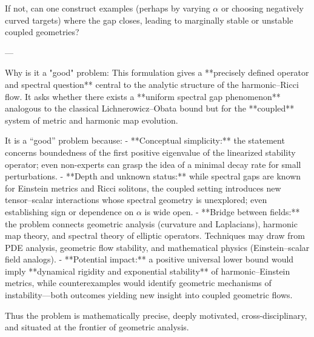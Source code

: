If not, can one construct examples (perhaps by varying \(\alpha\) or choosing negatively curved targets) where the gap closes, leading to marginally stable or unstable coupled geometries?

---

Why is it a "good" problem:  
This formulation gives a **precisely defined operator and spectral question** central to the analytic structure of the harmonic–Ricci flow. It asks whether there exists a **uniform spectral gap phenomenon** analogous to the classical Lichnerowicz–Obata bound but for the **coupled** system of metric and harmonic map evolution.  

It is a “good” problem because:
- **Conceptual simplicity:** the statement concerns boundedness of the first positive eigenvalue of the linearized stability operator; even non-experts can grasp the idea of a minimal decay rate for small perturbations.
- **Depth and unknown status:** while spectral gaps are known for Einstein metrics and Ricci solitons, the coupled setting introduces new tensor–scalar interactions whose spectral geometry is unexplored; even establishing sign or dependence on \(\alpha\) is wide open.
- **Bridge between fields:** the problem connects geometric analysis (curvature and Laplacians), harmonic map theory, and spectral theory of elliptic operators. Techniques may draw from PDE analysis, geometric flow stability, and mathematical physics (Einstein–scalar field analogs).
- **Potential impact:** a positive universal lower bound would imply **dynamical rigidity and exponential stability** of harmonic–Einstein metrics, while counterexamples would identify geometric mechanisms of instability—both outcomes yielding new insight into coupled geometric flows.

Thus the problem is mathematically precise, deeply motivated, cross-disciplinary, and situated at the frontier of geometric analysis.